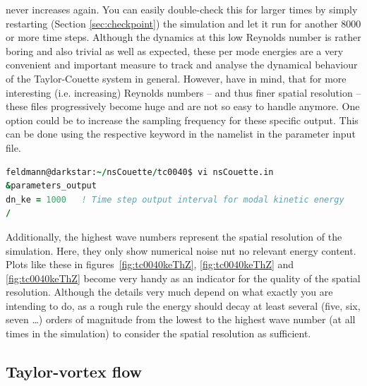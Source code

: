 \documentclass[a4paper, 11pt, DIV=11]{scrartcl}
\begin{document}
never increases again. You can easily double-check this for larger times by simply
restarting (Section \ref{sec:checkpoint}) the simulation and let it run for another
\num{8000} or more time steps. Although the dynamics at this low Reynolds number is
rather boring and also trivial as well as expected, these per mode energies are a
very convenient and important measure to track and analyse the dynamical behaviour
of the Taylor-Couette system in general. However, have in mind, that for more
interesting (i.e. increasing) Reynolds numbers -- and thus finer spatial resolution -- these
files progressively become huge and are not so easy to handle anymore. One option
could be to increase the sampling frequency for these specific output. This can be done
using the respective keyword in the namelist  in the parameter input file.
\begin{lstlisting}[language=fortran]
feldmann@darkstar:~/nsCouette/tc0040$ vi nsCouette.in  
&parameters_output
dn_ke = 1000   ! Time step output interval for modal kinetic energy
/
\end{lstlisting}
Additionally, the highest wave numbers represent the spatial resolution of the
simulation. Here, they only show numerical noise nut no relevant energy content.
Plots like these in figures~\ref{fig:tc0040keThZ}, \ref{fig:tc0040keThZ} and
\ref{fig:tc0040keThZ}
become very handy as an indicator
for the quality of the spatial resolution. Although the details very much depend on
what exactly you are intending to do, as a rough rule the energy should decay
at least several (five, six, seven \dots) orders of magnitude from the lowest to the
highest wave number (at all times in the simulation) to consider the spatial resolution
as sufficient. 


\subsection{Taylor-vortex flow}
\label{sec:tc0041}
\end{document}
